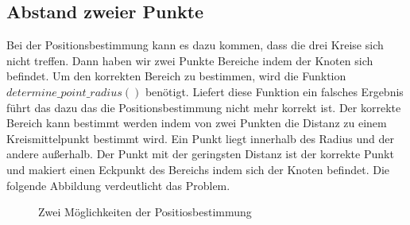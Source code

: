 \subsection{Abstand zweier Punkte}
Bei der Positionsbestimmung kann es dazu kommen, dass die drei Kreise sich nicht treffen. Dann haben wir zwei Punkte Bereiche indem der Knoten sich befindet. Um den korrekten Bereich zu bestimmen, wird die Funktion $determine\_point\_radius()$ benötigt. Liefert diese Funktion ein falsches Ergebnis führt das dazu das die Positionsbestimmung nicht mehr korrekt ist. Der korrekte Bereich kann bestimmt werden indem von zwei Punkten die Distanz zu einem Kreismittelpunkt bestimmt wird. Ein Punkt liegt innerhalb des Radius und der andere außerhalb. Der Punkt mit der geringsten Distanz ist der korrekte Punkt und makiert einen Eckpunkt des Bereichs indem sich der Knoten befindet. Die folgende Abbildung verdeutlicht das Problem.

\begin{figure}[H]
	\hspace*{-3.5cm}
	\caption{Zwei Möglichkeiten der Positiosbestimmung}
	\label{img:figure_abstand_zweier_punkte}
\end{figure}

